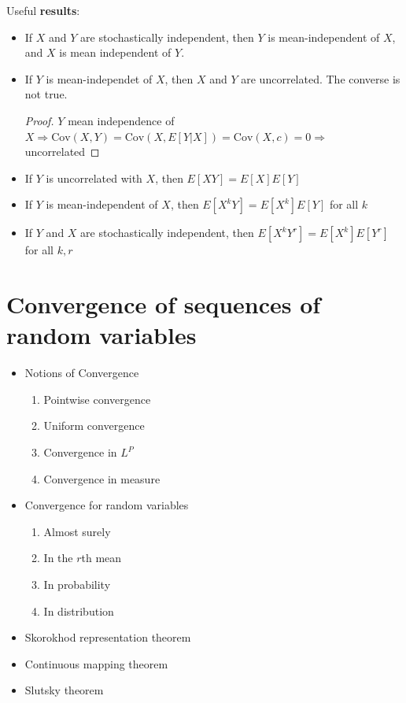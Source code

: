 Useful \textbf{results}:
\begin{itemize}
    \item If $X$ and $Y$ are stochastically independent, then $Y$ is mean-independent of $X$, and $X$ is mean independent of $Y$.
    \item If $Y$ is mean-independet of $X$, then $X$ and $Y$ are uncorrelated. The converse is not true.
        \begin{proof}
            $Y$ mean independence of $X \Rightarrow \text{Cov}(X,Y) = \text{Cov}(X, E[Y|X]) = \text{Cov}(X,c) = 0\Rightarrow$ uncorrelated
        \end{proof}
    \item If $Y$ is uncorrelated with $X$, then $E[XY] = E[X]E[Y]$
    \item If $Y$ is mean-independent of $X$, then $E[X^k Y]=E[X^k]E[Y]$ for all $k$
    \item If $Y$ and $X$ are stochastically independent, then $E[X^k Y^r] = E[X^k]E[Y^r]$ for all $k,r$
\end{itemize}

\section{Convergence of sequences of random variables}

\begin{itemize}
    \item Notions of Convergence
        \begin{enumerate}
            \item Pointwise convergence
            \item Uniform convergence
            \item Convergence in $L^P$
            \item Convergence in measure
        \end{enumerate}
    \item Convergence for random variables
        \begin{enumerate}
            \item Almost surely
            \item In the $r$th mean
            \item In probability
            \item In distribution
        \end{enumerate}
    \item Skorokhod representation theorem
    \item Continuous mapping theorem
    \item Slutsky theorem
\end{itemize}

